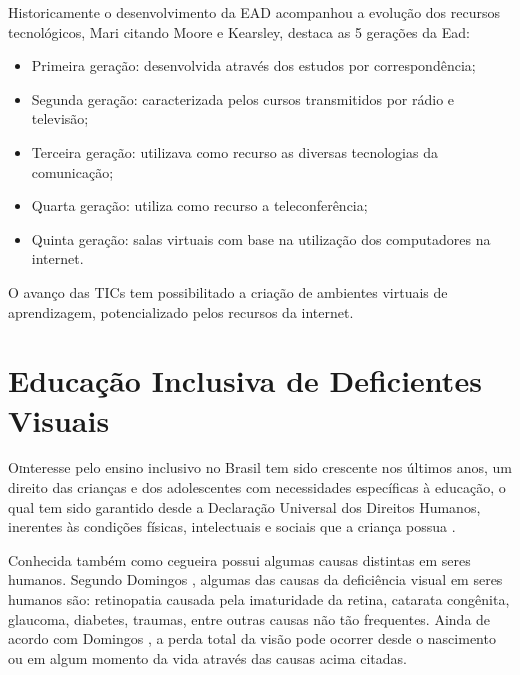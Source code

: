 Historicamente o desenvolvimento da EAD acompanhou a evolução dos recursos tecnológicos, Mari \cite{mari2011avaliaccao} citando Moore e Kearsley, destaca as 5 gerações da Ead:
\begin{itemize}
    \item Primeira geração: desenvolvida através dos estudos por correspondência;
    \item Segunda geração: caracterizada pelos cursos transmitidos por rádio e televisão;
    \item Terceira geração: utilizava como recurso as diversas tecnologias da comunicação;
    \item Quarta geração: utiliza como recurso a teleconferência;
    \item Quinta geração: salas virtuais com base na utilização dos computadores na internet.
\end{itemize}
O avanço das TICs tem possibilitado a criação de ambientes virtuais de aprendizagem, potencializado pelos recursos da internet.

\section{Educação Inclusiva de Deficientes Visuais}
\lettrine{O} interesse pelo ensino inclusivo no Brasil tem sido crescente nos últimos anos, um direito das crianças e dos adolescentes com necessidades específicas à educação, o qual tem sido garantido desde a Declaração Universal dos Direitos Humanos, inerentes às condições físicas, intelectuais e sociais que a criança possua \cite{de1994linha}.

Conhecida também como cegueira possui algumas causas distintas em seres humanos. Segundo Domingos \cite{domingos2008sexualidade}, algumas das causas da deficiência visual em seres humanos são: retinopatia causada pela imaturidade da retina, catarata congênita, glaucoma, diabetes, traumas, entre outras causas não tão frequentes. Ainda de acordo com Domingos \cite{domingos2008sexualidade}, a perda total da visão pode ocorrer desde o nascimento ou em algum momento da vida através das causas acima citadas.


